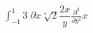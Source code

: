 \documentclass[border={2pt 2pt 2pt 2pt}]{standalone}
\begin{document}
$
\displaystyle \int_{-1}^{1} 3\;\partial x \sqrt[4]{2} \dfrac{2 x}{y} \frac{\partial^{2}}{\partial y^{2}}x 
$
\end{document}
